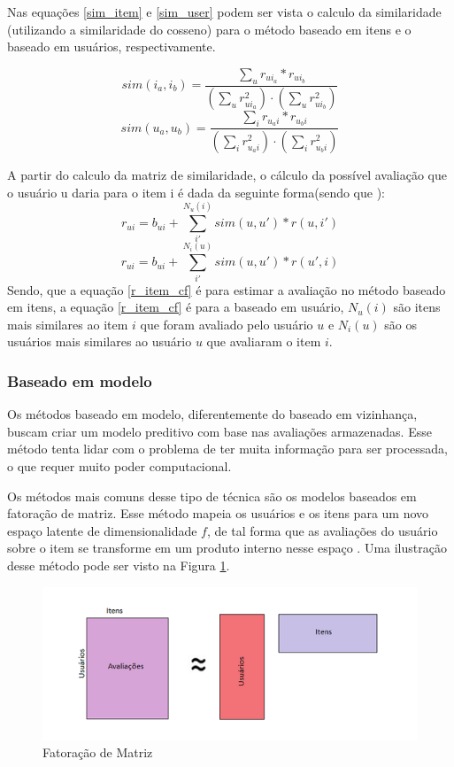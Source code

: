 Nas equações \ref{sim_item} e \ref{sim_user} podem ser vista o calculo da similaridade (utilizando a similaridade do cosseno) para o método baseado em itens e o baseado em usuários, respectivamente.

\begin{equation}
\label{sim_item}
    sim(i_a, i_b) = \frac{\sum_{u} r_{ui_a} * r_{ui_b}}{(\sum_{u} r_{ui_a}^{2}) \cdot (\sum_{u} r_{ui_b}^{2}) }
\end{equation}
\begin{equation}
\label{sim_user}
    sim(u_a, u_b) = \frac{\sum_{i} r_{u_ai} * r_{u_bi}}{(\sum_{i} r_{u_ai}^{2}) \cdot (\sum_{i} r_{u_bi}^{2}) }
\end{equation}

A partir do calculo da matriz de similaridade, o cálculo da possível avaliação que o usuário u daria para o item i é dada da seguinte forma(sendo que ):
\begin{equation}
\label{r_user_cf}  
r_{ui} = b_{ui} + \sum_{i'}^{N_u(i)} sim(u, u')*r(u, i') 
\end{equation}
\begin{equation}
\label{r_item_cf}  
r_{ui} = b_{ui} + \sum_{i'}^{N_i(u)} sim(u, u')*r(u', i) 
\end{equation}
Sendo, que a equação \ref{r_item_cf} é para estimar a avaliação no método baseado em itens, a equação \ref{r_item_cf} é para a baseado em usuário, \(N_u(i)\) são itens mais similares  ao item \(i\) que foram avaliado pelo usuário \(u\) e \(N_i(u)\) são os usuários mais similares ao usuário \(u\) que avaliaram o item \(i\).
\subsubsection{Baseado em modelo}
Os métodos baseado em modelo, diferentemente do baseado em vizinhança, buscam criar um modelo preditivo com base nas avaliações armazenadas. Esse método tenta lidar com o problema de ter muita informação  para ser processada, o que requer muito poder computacional\cite{thido2010}.

Os métodos mais comuns desse tipo de técnica são os modelos baseados em fatoração de matriz. Esse método mapeia os usuários e os itens para um novo espaço latente de  dimensionalidade \(f\), de tal forma que as avaliações do usuário sobre o item se transforme em um produto interno nesse espaço \cite{koren2015advances}. Uma ilustração desse método pode ser visto na Figura \ref{fig:matrix_fac}.
\begin{figure}[h!]
    \centering
    \includegraphics[width=14cm]{Imagens/matrix_fac.png}
    \caption{Fatoração de Matriz}
    \label{fig:matrix_fac}
\end{figure}

